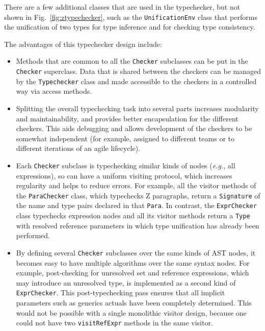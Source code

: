 \documentclass{llncs}
\begin{document}
There are a few additional classes that are used in the typechecker,
but not shown in Fig.~\ref{fig:ztypechecker}, such as the
\texttt{UnificationEnv} class that performs
the unification of two types for type inference and for checking type
consistency.

The advantages of this typechecker design include:
\begin{itemize}

\item Methods that are common to all the \texttt{Checker} subclasses can be put in
  the \texttt{Checker} superclass.  Data that is shared between the checkers
  can be managed by the \texttt{Typechecker} class and made accessible
  to the checkers in a controlled way via access methods.

\item Splitting the overall typechecking task into several parts increases
  modularity and maintainability, and provides better encapsulation
  for the different checkers.  This aids debugging and allows development
  of the checkers to be somewhat independent (for example, assigned to
  different teams or to different iterations of an agile lifecycle).

\item Each \texttt{Checker} subclass is typechecking similar kinds of
  nodes (\textit{e.g.}, all expressions), so can have a uniform visiting
  protocol, which increases regularity and helps to reduce errors.
  For example, all the visitor methods of the
  \texttt{ParaChecker} class, which typechecks Z paragraphs, return a
  \texttt{Signature} of the name and type pairs declared in that
  \texttt{Para}.  In contrast, the \texttt{ExprChecker} class
  typechecks expression nodes and all its visitor methods return a
  \texttt{Type} with resolved reference parameters in which type
  unification has already been performed.

\item By defining several \texttt{Checker} subclasses over the same kinds of
  AST nodes, it becomes easy to have multiple algorithms over the same
  syntax nodes.  For example, post-checking for unresolved set and
  reference expressions, which may introduce an unresolved type, is
  implemented as a second kind of \texttt{ExprChecker}. This post-typechecking
  pass ensures that all implicit parameters such as generics actuals
  have been completely determined.  This would not be possible with a
  single monolithic visitor design, because one could not have two
  \texttt{visitRefExpr} methods in the same visitor.

\end{itemize}
\end{document}

